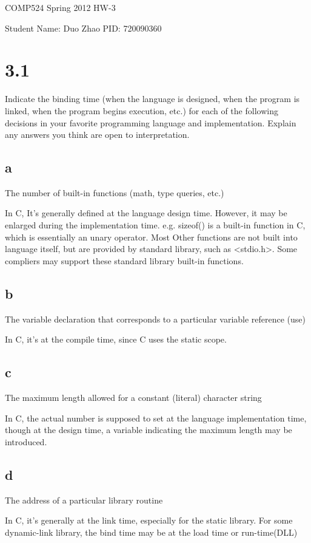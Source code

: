 \documentclass[a4paper, 11pt]{article}
\begin{document}
\centerline{\sc \large COMP524 Spring 2012 HW-3}
\vspace{.5pc}
\centerline{\sc Student Name: Duo Zhao  PID: 720090360}
\vspace{2pc}

\section{3.1}
	Indicate the binding time (when the language is designed, when the program is
linked, when the program begins execution, etc.) for each of the following
decisions in your favorite programming language and implementation. Explain any
answers you think are open to interpretation.
\subsection{a} The number of built-in functions (math, type queries, etc.)

In C, It's generally defined at the language design time. However, it may be
enlarged during the implementation time. e.g. sizeof() is a built-in function in
C, which is essentially an unary operator. Most Other functions are not built
into language itself, but are provided by standard library, such as <stdio.h>. 
Some compliers may support these standard library built-in functions.

\subsection{b} The variable declaration that corresponds to a particular variable reference (use)

In C, it's at the compile time, since C uses the static scope. 

\subsection{c}The maximum length allowed for a constant (literal) character string

In C, the actual number is supposed to set at the language implementation time,
though at the design time, a variable indicating the maximum length may be
introduced. 

\subsection{d}The address of a particular library routine

In C, it's generally at the link time, especially for the static library. For
some dynamic-link library, the bind time may be at the load time or
run-time(DLL)
\end{document}
